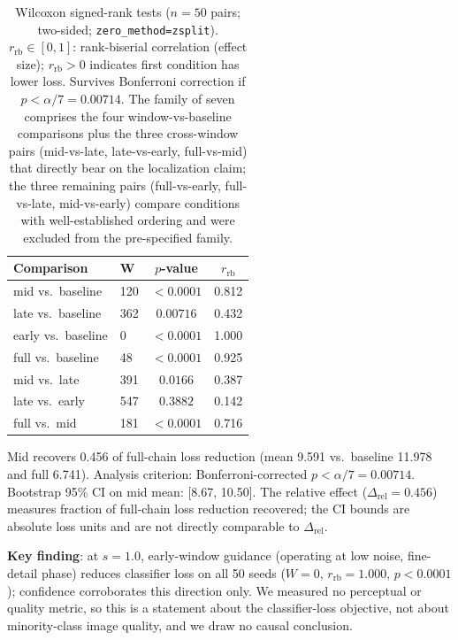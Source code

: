 \documentclass[10pt]{article}
\begin{document}
\begin{table}[h]
\centering
\caption{Wilcoxon signed-rank tests ($n=50$ pairs; two-sided; \texttt{zero\_method=zsplit}).
$r_\mathrm{rb} \in [0,1]$: rank-biserial correlation (effect size);
$r_\mathrm{rb} > 0$ indicates first condition has lower loss.
Survives Bonferroni correction if $p < \alpha/7 = 0.00714$.
The family of seven comprises the four window-vs-baseline comparisons plus the
three cross-window pairs (mid-vs-late, late-vs-early, full-vs-mid) that directly
bear on the localization claim; the three remaining pairs (full-vs-early,
full-vs-late, mid-vs-early) compare conditions with well-established ordering
and were excluded from the pre-specified family.}
\label{tab:wilcoxon}
\renewcommand{\arraystretch}{1.1}
\begin{tabular}{@{}llcc@{}}
\toprule
\textbf{Comparison} & \textbf{W} & \textbf{$p$-value} & \textbf{$r_\mathrm{rb}$} \\
\midrule
mid vs.\ baseline   & 120  & $<0.0001$ & 0.812 \\
late vs.\ baseline  & 362  & $0.00716$ & 0.432 \\
early vs.\ baseline &   0  & $<0.0001$ & 1.000 \\
full vs.\ baseline  &  48  & $<0.0001$ & 0.925 \\
mid vs.\ late       & 391  & $0.0166$  & 0.387 \\
late vs.\ early     & 547  & $0.3882$  & 0.142 \\
full vs.\ mid       & 181  & $<0.0001$ & 0.716 \\
\bottomrule
\end{tabular}
\end{table}

Mid recovers 0.456 of full-chain loss reduction (mean 9.591 vs.\ baseline
11.978 and full 6.741).  Analysis criterion: Bonferroni-corrected $p < \alpha/7 = 0.00714$.
Bootstrap 95\% CI on mid mean: [8.67, 10.50].  The relative effect
($\Delta_\mathrm{rel} = 0.456$) measures fraction of full-chain loss
reduction recovered; the CI bounds are absolute loss units and are not
directly comparable to $\Delta_\mathrm{rel}$.

\medskip

\noindent\textbf{Key finding}: at $s=1.0$, early-window guidance (operating at
low noise, fine-detail phase) reduces classifier loss on all 50 seeds
($W = 0$, $r_\mathrm{rb} = 1.000$, $p < 0.0001$); confidence corroborates this
direction only.  We measured no perceptual or quality metric, so this is a
statement about the classifier-loss objective, not about minority-class image
quality, and we draw no causal conclusion.
\end{document}

